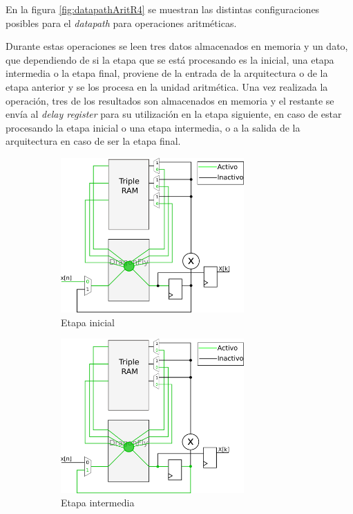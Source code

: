 En la figura \ref{fig:datapathAritR4} se muestran las distintas configuraciones posibles para el
\textit{datapath} para operaciones aritméticas.

Durante estas operaciones se leen tres datos almacenados en memoria y un dato, que dependiendo de si
la etapa que se está procesando es la inicial, una etapa intermedia o la etapa final, proviene de la
entrada de la arquitectura o de la etapa anterior y se los procesa en la unidad aritmética. Una vez
realizada la operación, tres de los resultados son almacenados en memoria y el restante se envía al
\textit{delay register} para su utilización en la etapa siguiente, en caso de estar procesando la
etapa inicial o una etapa intermedia, o a la salida de la arquitectura en caso de ser la etapa
final.

\begin{figure}[htb!]
        \centering
        \begin{subfigure}{\columnwidth}\centering
        \includegraphics[width=7cm]{./figures/datapathR4_arit_ini.png}
        \caption{Etapa inicial}
        \end{subfigure}
        \begin{subfigure}{\columnwidth}\centering
        \includegraphics[width=7cm]{./figures/datapathR4_arit_int.png}
        \caption{Etapa intermedia}
        \end{subfigure}
        \begin{subfigure}{\columnwidth}\centering

\end{subfigure}
\end{figure}
